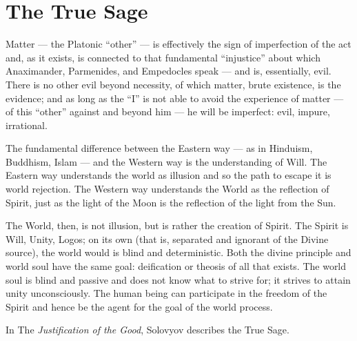 \section{The True Sage}

\begin{quotex}
Matter --- the Platonic ``other'' --- is effectively the sign of imperfection of the act and, as it exists, is connected to that fundamental ``injustice'' about which Anaximander, Parmenides, and Empedocles speak --- and is, essentially, evil. There is no other evil beyond necessity, of which matter, brute existence, is the evidence; and as long as the ``I'' is not able to avoid the experience of matter --- of this ``other'' against and beyond him --- he will be imperfect: evil, impure, irrational.
\end{quotex}


The fundamental difference between the Eastern way --- as in Hinduism, Buddhism, Islam --- and the Western way is the understanding of Will. The Eastern way understands the world as illusion and so the path to escape it is world rejection. The Western way understands the World as the reflection of Spirit, just as the light of the Moon is the reflection of the light from the Sun.

The World, then, is not illusion, but is rather the creation of Spirit. The Spirit is Will, Unity, Logos; on its own (that is, separated and ignorant of the Divine source), the world would is blind and deterministic. Both the divine principle and world soul have the same goal: deification or theosis of all that exists. The world soul is blind and passive and does not know what to strive for; it strives to attain unity unconsciously. The human being can participate in the freedom of the Spirit and hence be the agent for the goal of the world process.

In The \textit{Justification of the Good}, Solovyov describes the True Sage.

